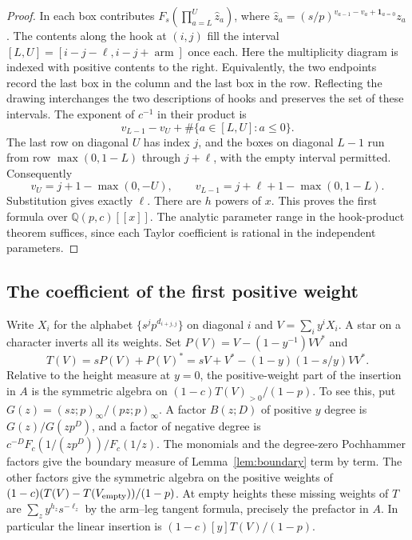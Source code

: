 \begin{proof}
In \cite[Theorem~1]{DS} each box contributes $F_s(\prod_{a=L}^{U}\widehat z_a)$, where $\widehat z_a=(s/p)^{v_{a-1}-v_a+\mathbf1_{a=0}}z_a$. The contents along the hook at $(i,j)$ fill the interval $[L,U]=[i-j-\ell,i-j+\operatorname{arm}]$ once each. Here the multiplicity diagram is indexed with positive contents to the right. Equivalently, the two endpoints record the last box in the column and the last box in the row. Reflecting the drawing interchanges the two descriptions of hooks and preserves the set of these intervals. The exponent of $c^{-1}$ in their product is
\[
 v_{L-1}-v_U+\#\{a\in[L,U]:a\le0\}.
\]
The last row on diagonal $U$ has index $j$, and the boxes on diagonal $L-1$ run from row $\max(0,1-L)$ through $j+\ell$, with the empty interval permitted. Consequently
\[
 v_U=j+1-\max(0,-U),\qquad
 v_{L-1}=j+\ell+1-\max(0,1-L).
\]
Substitution gives exactly $\ell$. There are $h$ powers of $x$. This proves the first formula over $\mathbb Q(p,c)[[x]]$. The analytic parameter range in the hook-product theorem suffices, since each Taylor coefficient is rational in the independent parameters.
\end{proof}
\subsection{The coefficient of the first positive weight}
Write $X_i$ for the alphabet $\{s^jp^{d_{i+j,j}}\}$ on diagonal $i$
and $V=\sum_i y^i X_i$. A star on a character inverts all its weights.
Set $P(V)=V-(1-y^{-1})VV^*$ and
\[
 T(V)=sP(V)+P(V)^*=sV+V^*-(1-y)(1-s/y)VV^* .
\]
Relative to the height measure at $y=0$, the positive-weight part
of the insertion in $A$ is the symmetric algebra on
$(1-c)T(V)_{>0}/(1-p)$. To see this, put
$G(z)=(sz;p)_\infty/(pz;p)_\infty$. A factor $B(z;D)$ of positive
$y$ degree is $G(z)/G(zp^D)$, and a factor of negative degree is
$c^{-D}F_c(1/(zp^D))/F_c(1/z)$. The monomials and the degree-zero
Pochhammer factors give the boundary measure of Lemma~\ref{lem:boundary}
term by term. The other factors give the symmetric algebra on the
positive weights of $(1-c)(T(V)-T(V_{\rm empty}))/(1-p)$.
At empty heights these missing weights of $T$ are
$\sum_z y^{h_z}s^{-\ell_z}$ by the arm--leg tangent formula, precisely
the prefactor in $A$. In particular the linear insertion is
$(1-c)[y]T(V)/(1-p)$.
